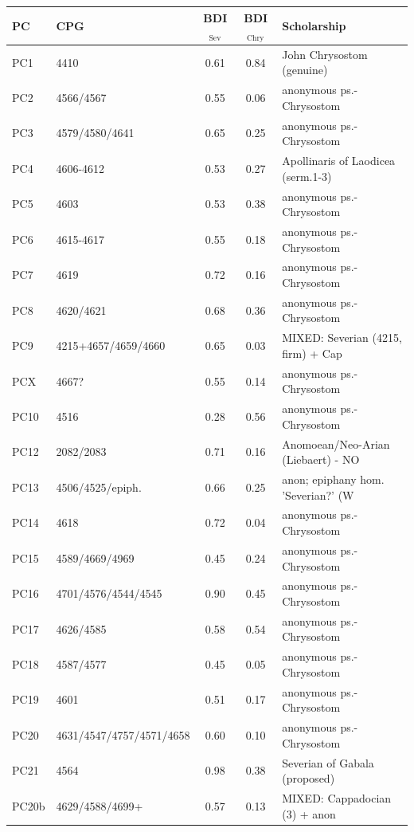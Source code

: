\begin{tabular}{llccl}
\toprule
PC & CPG & BDI$_{\text{Sev}}$ & BDI$_{\text{Chry}}$ & Scholarship \\
\midrule
PC1 & 4410 & 0.61 & 0.84 & John Chrysostom (genuine) \\
PC2 & 4566/4567 & 0.55 & 0.06 & anonymous ps.-Chrysostom \\
PC3 & 4579/4580/4641 & 0.65 & 0.25 & anonymous ps.-Chrysostom \\
PC4 & 4606-4612 & 0.53 & 0.27 & Apollinaris of Laodicea (serm.1-3) \\
PC5 & 4603 & 0.53 & 0.38 & anonymous ps.-Chrysostom \\
PC6 & 4615-4617 & 0.55 & 0.18 & anonymous ps.-Chrysostom \\
PC7 & 4619 & 0.72 & 0.16 & anonymous ps.-Chrysostom \\
PC8 & 4620/4621 & 0.68 & 0.36 & anonymous ps.-Chrysostom \\
PC9 & 4215+4657/4659/4660 & 0.65 & 0.03 & MIXED: Severian (4215, firm) + Cap \\
PCX & 4667? & 0.55 & 0.14 & anonymous ps.-Chrysostom \\
PC10 & 4516 & 0.28 & 0.56 & anonymous ps.-Chrysostom \\
PC12 & 2082/2083 & 0.71 & 0.16 & Anomoean/Neo-Arian (Liebaert) - NO \\
PC13 & 4506/4525/epiph. & 0.66 & 0.25 & anon; epiphany hom. 'Severian?' (W \\
PC14 & 4618 & 0.72 & 0.04 & anonymous ps.-Chrysostom \\
PC15 & 4589/4669/4969 & 0.45 & 0.24 & anonymous ps.-Chrysostom \\
PC16 & 4701/4576/4544/4545 & 0.90 & 0.45 & anonymous ps.-Chrysostom \\
PC17 & 4626/4585 & 0.58 & 0.54 & anonymous ps.-Chrysostom \\
PC18 & 4587/4577 & 0.45 & 0.05 & anonymous ps.-Chrysostom \\
PC19 & 4601 & 0.51 & 0.17 & anonymous ps.-Chrysostom \\
PC20 & 4631/4547/4757/4571/4658 & 0.60 & 0.10 & anonymous ps.-Chrysostom \\
PC21 & 4564 & 0.98 & 0.38 & Severian of Gabala (proposed) \\
PC20b & 4629/4588/4699+ & 0.57 & 0.13 & MIXED: Cappadocian (3) + anon \\
\bottomrule
\end{tabular}
